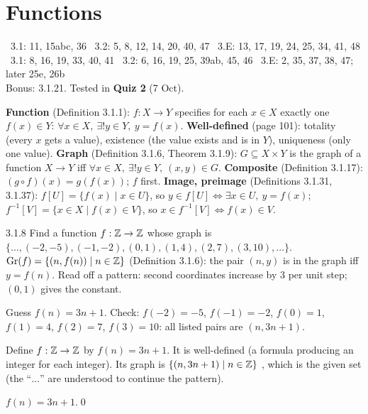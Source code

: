 \chapter{Functions}
%
{\fE\ 3.1: 11, 15abc, 36 \textperiodcentered\ 3.2: 5, 8, 12, 14, 20, 40, 47 \textperiodcentered\ 3.E: 13, 17, 19, 24, 25, 34, 41, 48\\ \fR\ 3.1: 8, 16, 19, 33, 40, 41 \textperiodcentered\ 3.2: 6, 16, 19, 25, 39ab, 45, 46 \textperiodcentered\ 3.E: 2, 35, 37, 38, 47; later 25e, 26b\\ Bonus: 3.1.21. Tested in \textbf{Quiz 2} (7 Oct).}


\begin{key}
\textbf{Function} (Definition 3.1.1): $f:X\to Y$ specifies for each $x\in X$ exactly one $f(x)\in Y$: $\forall x\in X,\ \exists!y\in Y,\ y=f(x)$. \textbf{Well-defined} (page 101): totality (every $x$ gets a value), existence (the value exists and is in $Y$), uniqueness (only one value). \textbf{Graph} (Definition 3.1.6, Theorem 3.1.9): $G\subseteq X\times Y$ is the graph of a function $X\to Y$ iff $\forall x\in X,\ \exists!y\in Y,\ (x,y)\in G$. \textbf{Composite} (Definition 3.1.17): $(g\circ f)(x)=g(f(x))$; $f$ first. \textbf{Image, preimage} (Definitions 3.1.31, 3.1.37): $f[U]=\{f(x)\mid x\in U\}$, so $y\in f[U]\Leftrightarrow\exists x\in U,\ y=f(x)$; $f^{-1}[V]=\{x\in X\mid f(x)\in V\}$, so $x\in f^{-1}[V]\Leftrightarrow f(x)\in V$.
\end{key}

\begin{bookex}[recommended]{3.1.8}
Find a function $f:\mathbb{Z}\to\mathbb{Z}$ whose graph is $\{\dots,(-2,-5),(-1,-2),(0,1),(1,4),(2,7),(3,10),\dots\}$.
\solution
\given $\mathrm{Gr}(f)=\{(n,f(n))\mid n\in\mathbb{Z}\}$ (Definition 3.1.6): the pair $(n,y)$ is in the graph iff $y=f(n)$.
\plan Read off a pattern: second coordinates increase by $3$ per unit step; $(0,1)$ gives the constant.
\begin{steps}
\item Guess $f(n)=3n+1$. Check: $f(-2)=-5$, $f(-1)=-2$, $f(0)=1$, $f(1)=4$, $f(2)=7$, $f(3)=10$: all listed pairs are $(n,3n+1)$.
\item Define $f:\mathbb{Z}\to\mathbb{Z}$ by $f(n)=3n+1$. It is well-defined (a formula producing an integer for each integer). Its graph is $\{(n,3n+1)\mid n\in\mathbb{Z}\}$ , which is the given set (the ``$\dots$'' are understood to continue the pattern).
\end{steps}
\answer $f(n)=3n+1$.\qed
\end{bookex}

